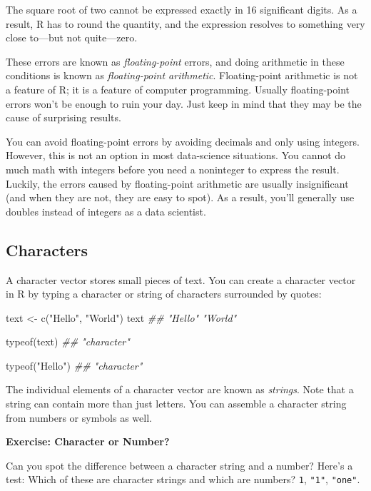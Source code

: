 \documentclass[
  letterpaper,
  DIV=11,
  numbers=noendperiod]{scrbook}
\newenvironment{Shaded}{\begin{snugshade}}{\end{snugshade}}
\newcommand{\DocumentationTok}[1]{\textcolor[rgb]{0.37,0.37,0.37}{\textit{#1}}}
\newcommand{\FunctionTok}[1]{\textcolor[rgb]{0.28,0.35,0.67}{#1}}
\newcommand{\NormalTok}[1]{\textcolor[rgb]{0.00,0.23,0.31}{#1}}
\newcommand{\OtherTok}[1]{\textcolor[rgb]{0.00,0.23,0.31}{#1}}
\newcommand{\StringTok}[1]{\textcolor[rgb]{0.13,0.47,0.30}{#1}}
\begin{document}
The square root of two cannot be expressed exactly in 16 significant
digits. As a result, R has to round the quantity, and the expression
resolves to something very close to---but not quite---zero.

These errors are known as \emph{floating-point} errors, and doing
arithmetic in these conditions is known as \emph{floating-point
arithmetic}. Floating-point arithmetic is not a feature of R; it is a
feature of computer programming. Usually floating-point errors won't be
enough to ruin your day. Just keep in mind that they may be the cause of
surprising results.

You can avoid floating-point errors by avoiding decimals and only using
integers. However, this is not an option in most data-science
situations. You cannot do much math with integers before you need a
noninteger to express the result. Luckily, the errors caused by
floating-point arithmetic are usually insignificant (and when they are
not, they are easy to spot). As a result, you'll generally use doubles
instead of integers as a data scientist.

\subsection{Characters}\label{characters}

A character vector stores small pieces of text. You can create a
character vector in R by typing a character or string of characters
surrounded by quotes:

\begin{Shaded}
\begin{Highlighting}[]
\NormalTok{text }\OtherTok{\textless{}{-}} \FunctionTok{c}\NormalTok{(}\StringTok{"Hello"}\NormalTok{,  }\StringTok{"World"}\NormalTok{)}
\NormalTok{text}
\DocumentationTok{\#\#  "Hello"  "World"}

\FunctionTok{typeof}\NormalTok{(text)}
\DocumentationTok{\#\# "character"}

\FunctionTok{typeof}\NormalTok{(}\StringTok{"Hello"}\NormalTok{)}
\DocumentationTok{\#\# "character"}
\end{Highlighting}
\end{Shaded}

The individual elements of a character vector are known as
\emph{strings}. Note that a string can contain more than just letters.
You can assemble a character string from numbers or symbols as well.

\begin{tcolorbox}[enhanced jigsaw, left=2mm, breakable, colback=white, colframe=quarto-callout-color-frame, leftrule=.75mm, bottomrule=.15mm, arc=.35mm, opacityback=0, rightrule=.15mm, toprule=.15mm]

\vspace{-3mm}\textbf{Exercise: Character or Number?}\vspace{3mm}

Can you spot the difference between a character string and a number?
Here's a test: Which of these are character strings and which are
numbers? \texttt{1}, \texttt{"1"}, \texttt{"one"}.

\end{tcolorbox}
\end{document}
